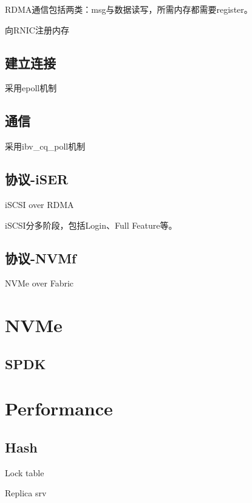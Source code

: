 RDMA通信包括两类：msg与数据读写，所需内存都需要register。

向RNIC注册内存

\subsection{建立连接}

采用epoll机制

\subsection{通信}

采用ibv\_cq\_poll机制

\subsection{协议-iSER}

iSCSI over RDMA

iSCSI分多阶段，包括Login、Full Feature等。

\subsection{协议-NVMf}

NVMe over Fabric

\section{NVMe}

\subsection{SPDK}

\section{Performance}

\subsection{Hash}

\begin{enumbox}
\item Lock table
\item Replica srv
\end{enumbox}
